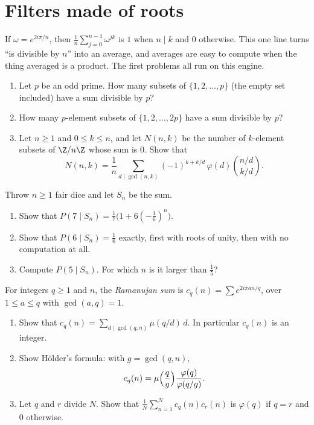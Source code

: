 \section{Filters made of roots}

If $\omega=e^{2i\pi/n}$, then $\frac1n\sum_{j=0}^{n-1}\omega^{jk}$ is $1$ when $n\mid k$ and $0$ otherwise. This one line
turns ``is divisible by $n$'' into an average, and averages are easy to compute when the thing averaged is a product. The
first problems all run on this engine.

\begin{exercise}[$\star\star$]\label{pb:subsetsum}
\begin{enumerate}[label=(\alph*)]
\item Let $p$ be an odd prime. How many subsets of $\{1,2,\dots,p\}$ (the empty set included) have a sum divisible by $p$?
\item How many $p$-element subsets of $\{1,2,\dots,2p\}$ have a sum divisible by $p$?
\item Let $n\ge1$ and $0\le k\le n$, and let $N(n,k)$ be the number of $k$-element subsets of $\Z/n\Z$ whose sum is $0$.
Show that
\[
N(n,k)=\frac1n\sum_{d\mid\gcd(n,k)}(-1)^{k+k/d}\,\varphi(d)\binom{n/d}{k/d}.
\]
\end{enumerate}
\end{exercise}

\begin{exercise}[$\star$]\label{pb:dicemod}
Throw $n\ge1$ fair dice and let $S_n$ be the sum.
\begin{enumerate}[label=(\alph*)]
\item Show that $P(7\mid S_n)=\frac17\bigl(1+6(-\frac16)^n\bigr)$.
\item Show that $P(6\mid S_n)=\frac16$ exactly, first with roots of unity, then with no computation at all.
\item Compute $P(5\mid S_n)$. For which $n$ is it larger than $\frac15$?
\end{enumerate}
\end{exercise}

\begin{exercise}[$\star\star$]\label{pb:ramsum}
For integers $q\ge1$ and $n$, the \emph{Ramanujan sum} is $c_q(n)=\sum e^{2i\pi an/q}$, over $1\le a\le q$ with
$\gcd(a,q)=1$.
\begin{enumerate}[label=(\alph*)]
\item Show that $c_q(n)=\sum_{d\mid\gcd(q,n)}\mu(q/d)\,d$. In particular $c_q(n)$ is an integer.
\item Show Hölder's formula: with $g=\gcd(q,n)$,
\[
c_q(n)=\mu\Bigl(\frac qg\Bigr)\frac{\varphi(q)}{\varphi(q/g)}.
\]
\item Let $q$ and $r$ divide $N$. Show that $\frac1N\sum_{n=1}^Nc_q(n)c_r(n)$ is $\varphi(q)$ if $q=r$ and $0$ otherwise.
\end{enumerate}
\end{exercise}

